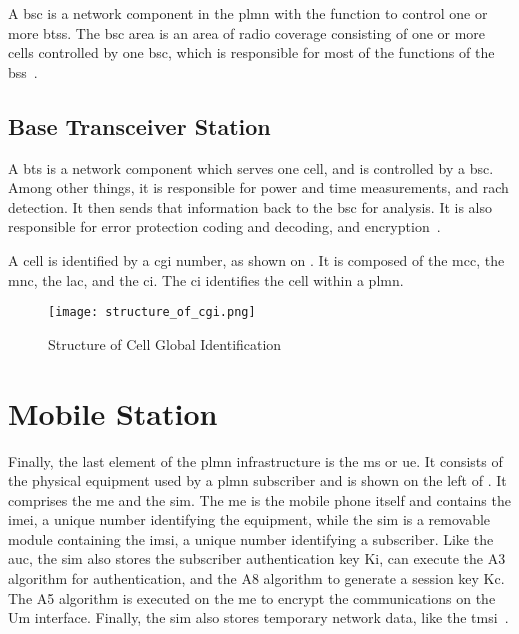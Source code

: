       A \gls{bsc} is a network component in the \gls{plmn} with the
      function to control one or more \glspl{bts}. The \gls{bsc} area
      is an area of radio coverage consisting of one or more cells
      controlled by one \gls{bsc}, which is responsible for most of
      the functions of the
      \gls{bss}~\cite{etsi_gsm_2001,3gpp_ts_2002,3gpp_ts_2015}.
 
    \subsection{Base Transceiver Station}
    \label{sec:cgi}

      A \gls{bts} is a network component which serves one cell, and is
      controlled by a \gls{bsc}. Among other things, it is responsible
      for power and time measurements, and \gls{rach} detection. It
      then sends that information back to the \gls{bsc} for analysis.
      It is also responsible for error protection coding and decoding,
      and encryption~\cite{etsi_gsm_2001,3gpp_ts_2002,3gpp_ts_2015}.
    
      \iffalse
      The cell is an area of radio coverage
      identified by a Base station identification\fxnote{defref}.
      0303
      \fi

      A cell is identified by a \gls{cgi} number, as shown on
      . It is composed of the \gls{mcc},
      the \gls{mnc}, the \gls{lac}, and the \gls{ci}. The \gls{ci}
      identifies the cell within a \gls{plmn}.

      \begin{figure}[h]
        \centering
        \texttt{[image: structure\_of\_cgi.png]}
        \caption{Structure of Cell Global
        Identification~\cite[p.~14]{3gpp_ts_2003}}
        \label{fig:structure_of_cgi}
      \end{figure}


    \section{Mobile Station}

      Finally, the last element of the \gls{plmn} infrastructure is the
      \gls{ms} or \gls{ue}. It consists of the physical equipment used
      by a \gls{plmn} subscriber and is shown on the left of
      . It comprises the \gls{me} and the
      \gls{sim}. The \gls{me} is the mobile phone itself and contains
      the \gls{imei}, a unique number identifying the equipment, while
      the \gls{sim} is a removable module containing the \gls{imsi}, a
      unique number identifying a subscriber. Like the \gls{auc}, the
      \gls{sim} also stores the subscriber authentication key Ki, can
      execute the A3 algorithm for authentication, and the A8 algorithm
      to generate a session key Kc. The A5 algorithm is executed on the
      \gls{me} to encrypt the communications on the Um interface.
      Finally, the \gls{sim} also stores temporary network data, like
      the
      \gls{tmsi}~\cite{etsi_gsm_2000,etsi_gsm_2001,3gpp_ts_2014-1,3gpp_ts_2015}.
